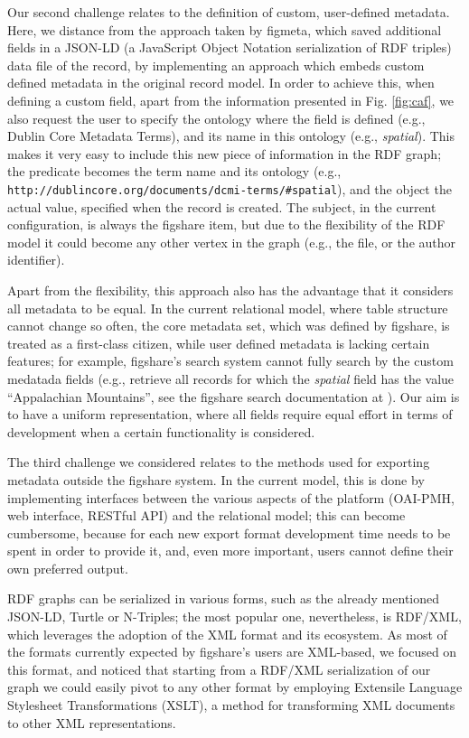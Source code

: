 Our second challenge relates to the definition of custom, user-defined metadata. Here, we distance
from the approach taken by figmeta, which saved additional fields in a JSON-LD (a JavaScript Object Notation serialization of RDF triples) data file of the
record, by implementing an approach which embeds custom defined metadata in the original record
model. In order to achieve this, when defining a custom field, apart from the information
presented in Fig. \ref{fig:caf}, we also request the user to specify the ontology where the field
is defined (e.g., Dublin Core Metadata Terms), and its name in this ontology (e.g., \emph{spatial}).
This makes it very easy to include this new piece of information in the RDF graph; the predicate
becomes the term name and its ontology (e.g., \nolinkurl{http://dublincore.org/documents/dcmi-terms/#spatial}),
and the object the actual value, specified when the record is created. The subject, in the
current configuration, is always the figshare item, but due to the flexibility of the RDF model
it could become any other vertex in the graph (e.g., the file, or the author identifier).

Apart from the flexibility, this approach also has the advantage that it considers all metadata
to be equal. In the current relational model, where table structure cannot change so often, the
core metadata set, which was defined by figshare, is treated as a first-class citizen, while user
defined metadata is lacking certain features; for example, figshare's search system cannot fully search by the custom medatada fields (e.g., retrieve all records for which the \emph{spatial} field has the value ``Appalachian Mountains'', see the figshare search documentation at \cite{figsearch}). Our aim is to have a uniform representation, where all fields require equal effort in terms of development when a certain functionality is considered.

The third challenge we considered relates to the methods used for exporting metadata outside the figshare system. In the current model, this is done by implementing interfaces between the various aspects of the platform (OAI-PMH, web interface, RESTful API) and the relational model; this can become cumbersome, because for each new export format development time needs to be spent in order to provide it, and, even more important, users cannot define
their own preferred output.

RDF graphs can be serialized in various forms, such as the already mentioned JSON-LD, Turtle or N-Triples; the most popular one, nevertheless, is RDF/XML, which leverages the adoption of the XML format and its ecosystem. As most of the formats currently expected by figshare's users are
XML-based, we focused on this format, and noticed that starting from a RDF/XML serialization of our
graph we could easily pivot to any other format by employing Extensile Language Stylesheet Transformations (XSLT), a method for transforming XML documents to other XML representations.

